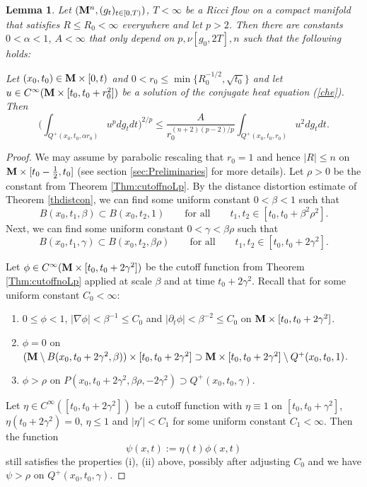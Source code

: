 \documentclass[11pt]{amsart}
\numberwithin{equation}{section}
\newtheorem{lemma}[theorem]{Lemma}
\def\lab{\label}
\def\a{\alpha}
\def\M{{\bf M}}
\numberwithin{equation}{section}
\begin{document}
\begin{lemma} \lab{lemoserCHE}
Let $(\M^n, (g_t)_{t \in [0,T)})$, $T < \infty$ be a Ricci flow on a compact manifold that satisfies $R \leq R_0 < \infty$ everywhere and let $p > 2$.
Then there are constants $0 < \alpha < 1$, $A < \infty$ that only depend on $p, \nu[g_0, 2T], n$ such that the following holds:

Let $(x_0, t_0) \in \M \times [0,t)$ and $0 < r_0 \leq \min \{ R_0^{-1/2}, \sqrt{t_0} \}$ and let $u \in C^\infty ( \M \times [t_0, t_0 + r_0^2])$ be a solution of the conjugate heat equation (\ref{che}).
Then
\[
\bigg( \int_{Q^+ (x_0, t_0, \a r_0)} u^p dg_t dt \bigg)^{2/p}
\le \frac{A}{r_0^{(n+2) (p-2)/p}} \int _{Q^+ (x_0, t_0,  r_0 )} u^2 dg_tdt.
\]
\end{lemma}

\begin{proof}
We may assume by parabolic rescaling that $r_0 = 1$ and hence $|R|  \leq n$ on $\M \times [t_0 - \tfrac12, t_0]$ (see section \ref{sec:Preliminaries} for more details).
Let $\rho > 0$ be the constant from Theorem \ref{Thm:cutoffnoLp}.
By the distance distortion estimate of Theorem \ref{thdistcon}, we can find some uniform constant $0 < \beta < 1$ such that
\[  B(x_0, t_1 , \beta) \subset B(x_0, t_2, 1) \qquad \text{for all} \qquad t_1, t_2 \in [t_0, t_0 + \beta^2 \rho^2]. \]
Next, we can find some uniform constant $0 < \gamma < \beta \rho$ such that
\[  B(x_0, t_1 , \gamma) \subset B(x_0, t_2, \beta \rho) \qquad \text{for all} \qquad t_1, t_2 \in [t_0, t_0 + 2 \gamma^2]. \]

Let $\phi \in C^\infty (\M \times [t_0, t_0 + 2\gamma^2])$ be the cutoff function from Theorem \ref{Thm:cutoffnoLp} applied at scale $\beta$ and at time $t_0 + 2 \gamma^2$.
Recall that for some uniform constant $C_0 < \infty$:
\begin{enumerate}[label=(\roman*)]
\item $0 \leq \phi < 1$, $|\nabla \phi | < \beta^{-1} \leq C_0$ and $|\partial_t \phi | < \beta^{-2} \leq C_0$ on $\M \times [t_0, t_0 + 2 \gamma^2]$.
\item $\phi = 0$ on $(\M \setminus B(x_0, t_0 + 2 \gamma^2, \beta)) \times [t_0, t_0 + 2 \gamma^2 ] \supset \M \times [t_0, t_0 + 2 \gamma^2] \setminus Q^+ (x_0, t_0, 1)$.
\item $\phi > \rho$ on $P(x_0, t_0 + 2 \gamma^2, \beta \rho, -2 \gamma^2) \supset Q^+ (x_0, t_0, \gamma  )$.
\end{enumerate}
Let $\eta \in C^\infty ([t_0, t_0 + 2\gamma^2])$ be a cutoff function with $\eta \equiv 1$ on $[t_0, t_0 + \gamma^2]$, $\eta (t_0 + 2 \gamma^2) = 0$, $\eta \leq 1$ and $|\eta' | < C_1$ for some uniform constant $C_1 < \infty$.
Then the function
\[ \psi (x,t) := \eta (t) \phi (x,t) \]
still satisfies the properties (i), (ii) above, possibly after adjusting $C_0$ and we have $\psi > \rho$ on $Q^+ (x_0, t_0, \gamma)$.


\end{proof}
\end{document}
